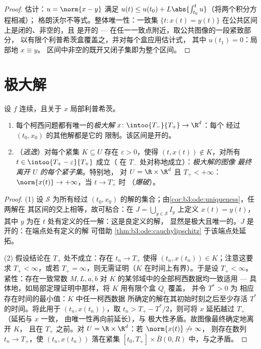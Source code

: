 \begin{proof}
估计：$u = \norm{x - y}$ 满足 $u(t) \leq u(t_0)
+ L\abs{\int_{t_0}^tu}$（将两个积分方程相减）；
格朗沃尔不等式。整体唯一性：一致集 $\{t : x(t)
= y(t)\}$ 在公共区间上是闭的、非空的，且
是开的 --- 在任一一致点附近，取公共图像的一段紧致部分，
以有限个利普希茨盒覆盖之，并对每个盒应用估计式，
其中 $u(t_1) = 0$：局部地 $x \equiv y$。
区间中非空的既开又闭子集即为整个区间。
\end{proof}

\section{极大解}

\begin{theorem}
\label{thm:b3:ode:maximal}
设 $f$ 连续，且关于 $x$ 局部利普希茨。
\begin{enumerate}
  \item 每个柯西问题都有唯一的\emph{极大解}
        $x \colon \intoo{T_-}{T_+} \to \R^d$：每个
        经过 $(t_0, x_0)$ 的其他解都是它的
        限制。该区间是开的。
  \item （\emph{逃逸}）对每个紧集 $K \subseteq U$
        存在 $\varepsilon > 0$，使得 $(t, x(t)) \notin
        K$，对所有 $t \in \intoo{T_+ - \varepsilon}{T_+}$ 成立（
        在 $T_-$ 处对称地成立）：\emph{极大解的图像
        最终离开
        $U$ 的每个紧子集}。特别地，
        对 $U = \R\times\R^d$ 且 $T_+ < +\infty$：
        $\norm{x(t)} \to +\infty$，当 $t \to T_+^-$ 时
        （\emph{爆破}）。
\end{enumerate}
\end{theorem}

\begin{proof}
(1) 设 $\mathcal S$ 为所有经过
$(t_0, x_0)$ 的解的集合；由\cref{cor:b3:ode:uniqueness}，任两解在
其区间的交上相等，故可粘合：在 $J =
\bigcup_{y \in \mathcal S}I_y$ 上定义 $x(t) = y(t)$，其中
$y$ 为在 $t$ 处有定义的任一解：这是良定义的解，
显然是极大且唯一的。$J$ 是开的：在端点处有定义的解
可借助
\cref{thm:b3:ode:cauchylipschitz} 于该端点处延拓。

(2) 假设结论在 $T_+$ 处不成立：存在 $t_n \to
T_+$ 使得 $(t_n, x(t_n)) \in K$；注意这要求 $T_+ <
\infty$，或若 $T_+ = \infty$，则无需证明（$K$
在时间上有界）。于是设 $T_+ < \infty$。紧性：存在一致常数 $M, L, a,
b$ 对 $K$ 的某邻域中的全部柯西数据均一致适用
--- 具体地，如局部定理证明中那样，将 $K$ 用有限个盒 $Q_i$ 覆盖，
并令 $T^* > 0$ 为
相应存在时间的最小值：$K$ 中任一柯西数据
所确定的解在其初始时刻之后至少存活 $T^*$
的时间。将此用于 $(t_n, x(t_n))$，取 $t_n > T_+ -
T^*/2$，则可将 $x$ 延拓越过 $T_+$（延拓与 $x$ 一致，
由唯一性再向前延长），与
极大性矛盾。故图像最终确定地离开 $K$，
且在 $T_+$ 之前。对 $U = \R\times\R^d$：若 $\norm{x(t)}\not\to\infty$，
则存在数列 $t_n \to T_+$，使 $(t_n, x(t_n))$ 落在紧集
$[t_0, T_+]\times\bar B(0, R)$ 中，与之矛盾。
\end{proof}


